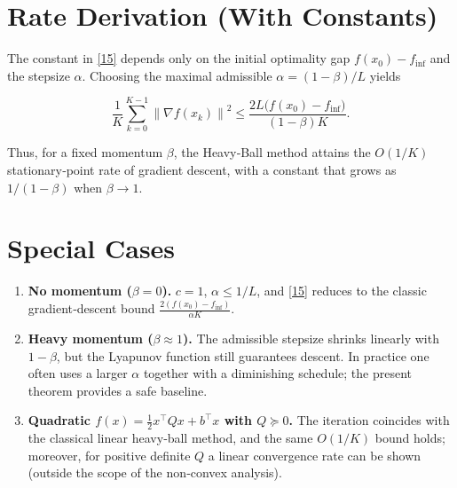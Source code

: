 \documentclass{article}
\newcommand{\norm}[1]{\left\|#1\right\|}
\begin{document}
\section*{Rate Derivation (With Constants)}
The constant in \eqref{15} depends only on the initial optimality gap $f(x_0)-f_{\inf}$ and the stepsize $\alpha$. Choosing the maximal admissible $\alpha=(1-\beta)/L$ yields  

\[
\frac{1}{K}\sum_{k=0}^{K-1}\norm{\nabla f(x_k)}^{2}
\le \frac{2L\bigl(f(x_0)-f_{\inf}\bigr)}{(1-\beta)K}.
\]

Thus, for a fixed momentum $\beta$, the Heavy‑Ball method attains the $O(1/K)$ stationary‑point rate of gradient descent, with a constant that grows as $1/(1-\beta)$ when $\beta\to1$.

\section*{Special Cases}
\begin{enumerate}[label=\arabic*.]
\item \textbf{No momentum ($\beta=0$).}  $c=1$, $\alpha\le 1/L$, and \eqref{15} reduces to the classic gradient‑descent bound $\frac{2(f(x_0)-f_{\inf})}{\alpha K}$.
\item \textbf{Heavy momentum ($\beta\approx1$).}  The admissible stepsize shrinks linearly with $1-\beta$, but the Lyapunov function still guarantees descent. In practice one often uses a larger $\alpha$ together with a diminishing schedule; the present theorem provides a safe baseline.
\item \textbf{Quadratic $f(x)=\frac12 x^{\top}Qx+b^{\top}x$ with $Q\succeq0$.}  The iteration coincides with the classical linear heavy‑ball method, and the same $O(1/K)$ bound holds; moreover, for positive definite $Q$ a linear convergence rate can be shown (outside the scope of the non‑convex analysis).
\end{enumerate}
\end{document}
